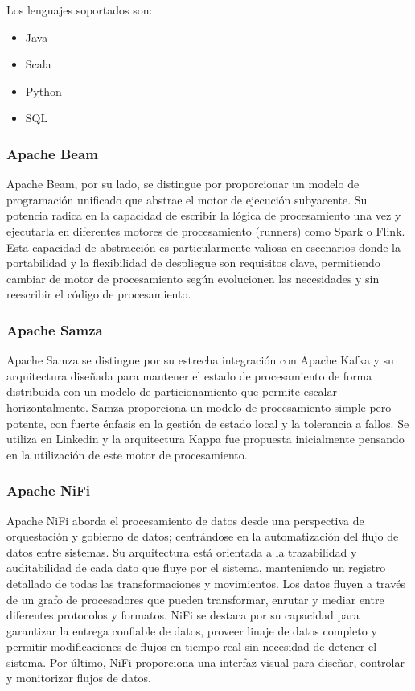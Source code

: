 Los lenguajes soportados son:

\begin{itemize}
    \item Java
    \item Scala
    \item Python
    \item SQL
\end{itemize}

\subsubsection{Apache Beam}

Apache Beam, por su lado, se distingue por proporcionar un modelo de programación unificado que abstrae el motor de ejecución subyacente.
Su potencia radica en la capacidad de escribir la lógica de procesamiento una vez y ejecutarla en 
diferentes motores de procesamiento (runners) como Spark o Flink.
Esta capacidad de abstracción es particularmente valiosa en escenarios donde la portabilidad y la flexibilidad de despliegue son requisitos clave, 
permitiendo cambiar de motor de procesamiento según evolucionen las necesidades y sin reescribir el código de procesamiento.

\subsubsection{Apache Samza}

Apache Samza se distingue por su estrecha integración con Apache Kafka y su arquitectura diseñada para mantener el estado 
de procesamiento de forma distribuida con un modelo de particionamiento que permite escalar horizontalmente.
Samza proporciona un modelo de procesamiento simple pero potente, con fuerte énfasis en la gestión de estado local y la tolerancia a fallos.
Se utiliza en Linkedin y la arquitectura Kappa fue propuesta inicialmente pensando en la utilización de este motor de procesamiento.

\subsubsection{Apache NiFi}

Apache NiFi aborda el procesamiento de datos desde una perspectiva de orquestación y gobierno de datos; 
centrándose en la automatización del flujo de datos entre sistemas.
Su arquitectura está orientada a la trazabilidad y auditabilidad de cada dato que fluye por el sistema, 
manteniendo un registro detallado de todas las transformaciones y movimientos. Los datos fluyen 
a través de un grafo de procesadores que pueden transformar, enrutar y mediar entre diferentes protocolos y formatos. 
NiFi se destaca por su capacidad para garantizar la entrega confiable de datos, proveer linaje de datos completo y 
permitir modificaciones de flujos en tiempo real sin necesidad de detener el sistema.
Por último, NiFi proporciona una interfaz visual para diseñar, controlar y 
monitorizar flujos de datos.

